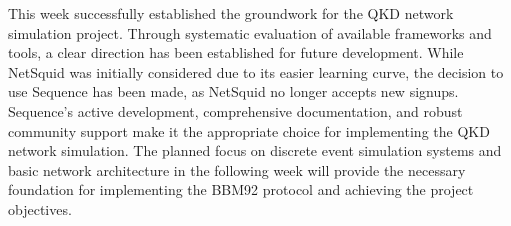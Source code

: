 This week successfully established the groundwork for the QKD network simulation project. Through systematic evaluation of available frameworks and tools, a clear direction has been established for future development. While NetSquid \cite{NetSquidTutorial} was initially considered due to its easier learning curve, the decision to use Sequence \cite{SequenceTutorial} has been made, as NetSquid no longer accepts new signups. Sequence's active development, comprehensive documentation, and robust community support make it the appropriate choice for implementing the QKD network simulation. The planned focus on discrete event simulation systems and basic network architecture in the following week will provide the necessary foundation for implementing the BBM92 \cite{BBM92Paper} protocol and achieving the project objectives.


\newpage
{}



\nocite{NetSquidTutorial, SequenceTutorial, BBM92Paper}


